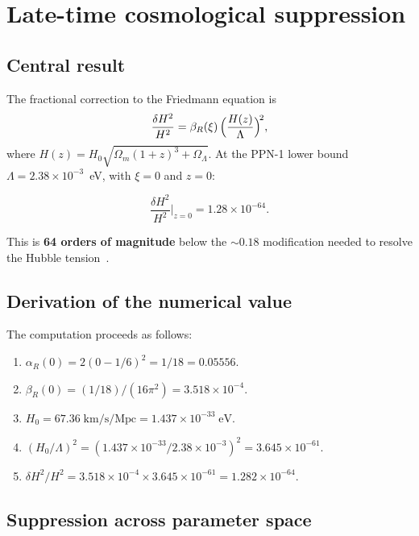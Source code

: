 \documentclass[12pt,a4paper]{article}
\newcommand{\Lam}{\Lambda}
\theoremstyle{plain}
\theoremstyle{definition}
\begin{document}
\section{Late-time cosmological suppression}
\label{sec:late-time}

\subsection{Central result}

The fractional correction to the Friedmann equation is
\begin{equation}\label{eq:suppression}
  \frac{\delta H^2}{H^2}
  = \beta_R(\xi)\,\Bigl(\frac{H(z)}{\Lam}\Bigr)^{\!2},
\end{equation}
where $H(z) = H_0\sqrt{\Omega_m(1+z)^3 + \Omega_\Lam}$.  At the PPN-1
lower bound $\Lam = 2.38 \times 10^{-3}$~eV, with $\xi = 0$ and $z = 0$:

\begin{equation}\label{eq:central-suppression}
  \boxed{
  \frac{\delta H^2}{H^2}\bigg|_{z=0}
  = 1.28 \times 10^{-64}.
  }
\end{equation}

This is \textbf{64 orders of magnitude} below the $\sim 0.18$ modification
needed to resolve the Hubble tension~\cite{Planck:2018vyg}.

\subsection{Derivation of the numerical value}

The computation proceeds as follows:
\begin{enumerate}[nosep]
  \item $\alpha_R(0) = 2(0 - 1/6)^2 = 1/18 = 0.05556$.
  \item $\beta_R(0) = (1/18)/(16\pi^2) = 3.518 \times 10^{-4}$.
  \item $H_0 = 67.36\;\mathrm{km/s/Mpc}
    = 1.437 \times 10^{-33}\;\mathrm{eV}$.
  \item $(H_0/\Lam)^2
    = (1.437 \times 10^{-33}/2.38 \times 10^{-3})^2
    = 3.645 \times 10^{-61}$.
  \item $\delta H^2/H^2 = 3.518 \times 10^{-4}
    \times 3.645 \times 10^{-61}
    = 1.282 \times 10^{-64}$.
\end{enumerate}

\subsection{Suppression across parameter space}
\end{document}
